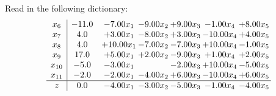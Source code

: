 \documentclass[9pt]{article}
\begin{document}
Read in the following dictionary:
\[\begin{array}{c| c c@{\hskip 2pt} c@{\hskip 2pt} c@{\hskip 2pt} c@{\hskip 2pt} c@{\hskip 2pt} }
 x_{6}   &  -11.0 & -7.00 x_{1} & -9.00 x_{2} & +  9.00 x_{3} & -1.00 x_{4} & +  8.00 x_{5}\\
 x_{7}   &  4.0 & +  3.00 x_{1} & -8.00 x_{2} & +  3.00 x_{3} & -10.00 x_{4} & +  4.00 x_{5}\\
 x_{8}   &  4.0 & + 10.00 x_{1} & -7.00 x_{2} & -7.00 x_{3} & + 10.00 x_{4} & -1.00 x_{5}\\
 x_{9}   &  17.0 & +  5.00 x_{1} & +  2.00 x_{2} & -9.00 x_{3} & +  1.00 x_{4} & +  2.00 x_{5}\\
 x_{10}   &  -5.0 & -3.00 x_{1} &   & -2.00 x_{3} & + 10.00 x_{4} & -5.00 x_{5}\\
 x_{11}   &  -2.0 & -2.00 x_{1} & -4.00 x_{2} & +  6.00 x_{3} & -10.00 x_{4} & +  6.00 x_{5}\\
\hline
z    &  0.0 & -4.00 x_{1} & -3.00 x_{2} & -5.00 x_{3} & -1.00 x_{4} & -4.00 x_{5}\\
\end{array}\]
\end{document}
